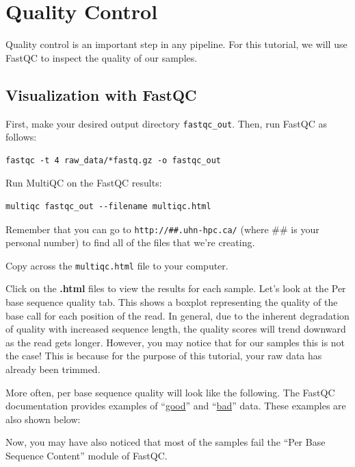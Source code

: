 \documentclass[
]{book}
\begin{document}
\section{Quality Control}\label{quality-control}

Quality control is an important step in any pipeline. For this tutorial, we will use FastQC to inspect the quality of our samples.

\subsection{Visualization with FastQC}\label{visualization-with-fastqc}

First, make your desired output directory \texttt{fastqc\_out}. Then, run FastQC as follows:

\begin{verbatim}
fastqc -t 4 raw_data/*fastq.gz -o fastqc_out
\end{verbatim}

Run MultiQC on the FastQC results:

\begin{verbatim}
multiqc fastqc_out --filename multiqc.html
\end{verbatim}

Remember that you can go to \texttt{http://\#\#.uhn-hpc.ca/} (where \#\# is your personal number) to find all of the files that we're creating.

Copy across the \texttt{multiqc.html} file to your computer.

Click on the \textbf{.html} files to view the results for each sample. Let's look at the Per base sequence quality tab. This shows a boxplot representing the quality of the base call for each position of the read. In general, due to the inherent degradation of quality with increased sequence length, the quality scores will trend downward as the read gets longer. However, you may notice that for our samples this is not the case! This is because for the purpose of this tutorial, your raw data has already been trimmed.

More often, per base sequence quality will look like the following. The FastQC documentation provides examples of ``\href{https://www.bioinformatics.babraham.ac.uk/projects/fastqc/good_sequence_short_fastqc.html\#M1}{good}'' and ``\href{https://www.bioinformatics.babraham.ac.uk/projects/fastqc/bad_sequence_fastqc.html}{bad}'' data. These examples are also shown below:

Now, you may have also noticed that most of the samples fail the ``Per Base Sequence Content'' module of FastQC.
\end{document}
